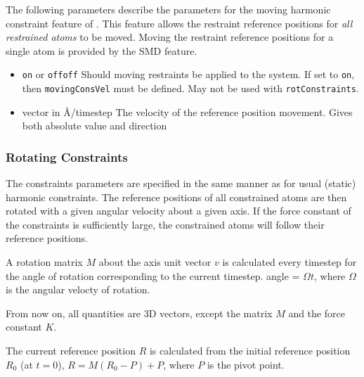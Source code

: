 The following parameters describe the parameters for the
moving harmonic constraint feature of \NAMD.
This feature allows the restraint reference positions
for {\em all restrained atoms} to be moved.
Moving the restraint reference positions for a single atom
is provided by the SMD feature.

\begin{itemize}

\item
{}
{{\tt on} or {\tt off}}{{\tt off}}
{Should moving restraints be applied to the system. If set
to {\tt on}, then  {\tt movingConsVel} must be defined.
May not be used with {\tt rotConstraints}.}

\item
{}
{vector in \AA/timestep}
{The velocity of the reference position movement. Gives both absolute
value and direction}

\end{itemize}

\subsubsection{Rotating Constraints}

The constraints parameters are specified in the same manner as for
usual (static) harmonic constraints. The reference positions of all
constrained atoms are then rotated with a given angular velocity
about a given axis. If the force constant of the constraints is
sufficiently
large, the constrained atoms will follow their reference positions.

A rotation matrix $M$ about the axis unit vector $v$ is calculated every
timestep
for the angle of rotation corresponding to the current timestep.
    angle = $\Omega t$,
where $\Omega$ is the angular velocty of rotation.

From now on, all quantities are 3D vectors, except the matrix $M$ and the
force constant $K$.

The current reference position $R$ is calculated from the initial
reference
position $R_0$ (at $t=0$),
    $R = M (R_0 - P) + P$,
where $P$ is the pivot point.

%
%
%

